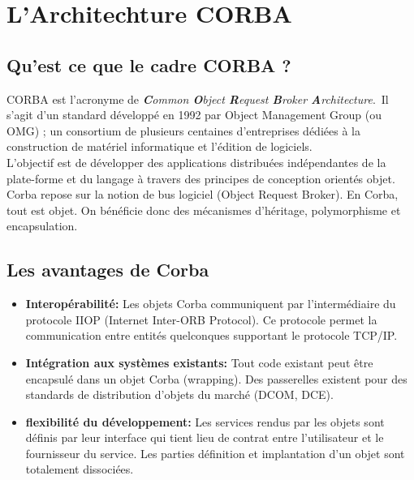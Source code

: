 \chapter{L'Architechture CORBA}

    \section{Qu'est ce que le cadre CORBA ?}

        \par CORBA est l’acronyme de \textit{\textbf{C}ommon \textbf{O}bject \textbf{R}equest \textbf{B}roker \textbf{A}rchitecture}. Il s’agit d’un standard développé en 1992 par Object Management Group (ou OMG) ; un consortium de plusieurs centaines d’entreprises dédiées à la construction de matériel informatique et l’édition de logiciels.\\
        L’objectif est de développer des applications distribuées indépendantes de la plate-forme et du langage à travers des principes de conception orientés objet.\\

        Corba repose sur la notion de bus logiciel (Object Request Broker).
        En Corba, tout est objet. On bénéficie donc des mécanismes d'héritage, polymorphisme et encapsulation.

    \section{Les avantages de Corba}

        \begin{itemize}[label= ]
            \item \textbf{Interopérabilité: }Les objets Corba communiquent par l'intermédiaire du protocole IIOP (Internet Inter-ORB Protocol). Ce protocole permet la communication entre entités quelconques supportant le protocole TCP/IP.
            \item \textbf{Intégration aux systèmes existants: }Tout code existant peut être encapsulé dans un objet Corba (wrapping). Des passerelles existent pour des standards de distribution d'objets du marché (DCOM, DCE).
            \item \textbf{flexibilité du développement: }Les services rendus par les objets sont définis par leur interface qui tient lieu de contrat entre l'utilisateur et le fournisseur du service. Les parties définition et implantation d'un objet sont totalement dissociées.
        \end{itemize}

